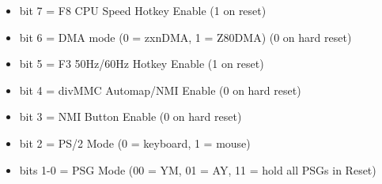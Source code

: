\begin{itemize}
\item bit 7 = F8 CPU Speed Hotkey Enable (1 on reset)
\item bit 6 = DMA mode (0 = zxnDMA, 1 = Z80DMA) (0 on hard reset)
\item bit 5 = F3 50Hz/60Hz Hotkey Enable (1 on reset)
\item bit 4 = divMMC Automap/NMI Enable (0 on hard reset)
\item bit 3 = NMI Button Enable (0 on hard reset)
\item bit 2 = PS/2 Mode (0 = keyboard, 1 = mouse)
\item bits 1-0 = PSG Mode (00 = YM, 01 = AY, 11 = hold all PSGs in Reset)
\end{itemize}

